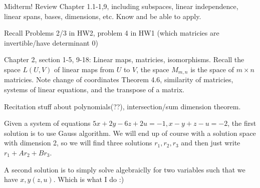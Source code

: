 \documentclass{report}
\begin{document}
Midterm! Review Chapter 1.1-1,9, including subspaces, linear independence, linear spans, bases, dimensions, etc. Know and be able to apply.

Recall Problems 2/3 in HW2, problem 4 in HW1 (which matricies are invertible/have determinant $0$)

Chapter 2, section 1-5, 9-18: Linear maps, matricies, isomorphisms. Recall the space $L(U,V)$ of linear maps from $U$ to $V$, the space $M_{m,n}$ is the space of $m\times n$ matricies. Note change of coordinates Theorem 4.6, similarity of matricies, systems of linear equations, and the transpose of a matrix.

Recitation stuff about polynomials(??), intersection/sum dimension theorem.

Given a system of equations $5x+2y-6z+2u = -1, x-y+z-u=-2$, the first solution is to use Gauss algorithm. We will end up of course with a solution space with dimension 2, so we will find three solutions $r_1, r_2, r_3$ and then just write $r_1 + Ar_2 + Br_3$. 

A second solution is to simply solve algebraiclly for two variables such that we have $x,y(z,u)$. Which is what I do :)
 
\end{document}
